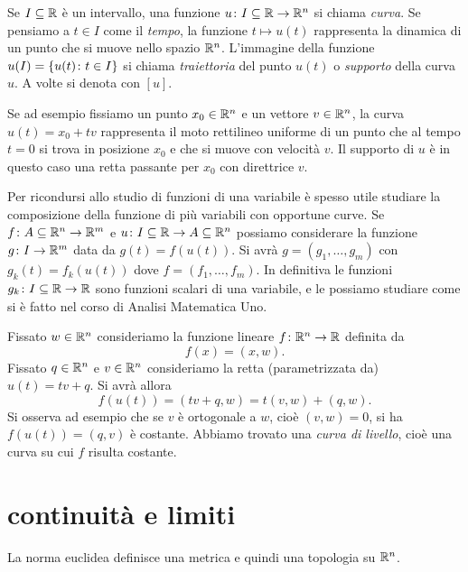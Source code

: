 Se $I\subseteq {\mathbb R}$ è un intervallo, 
una funzione $ u\colon I\subseteq {\mathbb R} \to {\mathbb R}^n$ si chiama 
\emph{curva}. 
Se pensiamo a $t\in I$ come il \emph{tempo}, la funzione 
$t\mapsto  u(t)$ rappresenta la dinamica di un punto 
che si muove nello spazio ${\mathbb R}^n$.
L'immagine della funzione $ u(I) = {\left\{  u(t)\colon t\in I \right\}}$
si chiama \emph{traiettoria} del punto $ u(t)$ o \emph{supporto}
della curva $ u$.
A volte si denota con $[ u]$.

Se ad esempio fissiamo un punto $ x_0\in {\mathbb R}^n$ 
e un vettore $ v\in {\mathbb R}^n$, la curva $ u(t) =  x_0 + t  v$
rappresenta il moto rettilineo uniforme di un punto che al tempo $t=0$ 
si trova in posizione $x_0$ e che si muove con velocità $ v$.
Il supporto di $ u$ è in questo caso una retta passante per $x_0$ 
con direttrice $ v$.

Per ricondursi allo studio di funzioni di una variabile 
è spesso utile studiare la composizione della funzione di più variabili 
con opportune curve. 
Se $ f\colon A \subseteq {\mathbb R}^n\to {\mathbb R}^m$ e $ u\colon I\subseteq {\mathbb R}\to A\subseteq {\mathbb R}^n$ 
possiamo considerare la funzione $ g\colon I \to {\mathbb R}^m$ 
data da $ g(t) =  f( u(t))$. 
Si avrà $ g = (g_1,\dots, g_m)$ con $g_k(t) = f_k( u(t))$
dove $ f = (f_1,\dots, f_m)$. 
In definitiva le funzioni $g_k\colon I\subseteq {\mathbb R} \to {\mathbb R}$ 
sono funzioni scalari di una variabile, e le possiamo studiare 
come si è fatto nel corso di Analisi Matematica Uno.

\begin{example}
Fissato $ w \in {\mathbb R}^n$ consideriamo la funzione 
lineare $f \colon {\mathbb R}^n \to {\mathbb R}$ definita da 
\[
   f( x) = ( x ,  w).
\]  
Fissato $ q\in {\mathbb R}^n$ e $ v \in {\mathbb R}^n$ consideriamo la retta (parametrizzata da)
$ u(t) = t  v +  q$.
Si avrà allora 
\[
  f( u(t)) = (t  v +  q,  w) = t ( v, w) + ( q,  w).
\]
Si osserva ad esempio che se $ v$ è ortogonale a $ w$,
cioè $( v,  w)=0$, si ha $f( u(t))= ( q,  v)$ è costante.
Abbiamo trovato una \emph{curva di livello}, cioè una curva su 
cui $f$ risulta costante.
\end{example}


\section{continuità e limiti}
La norma euclidea definisce una metrica e quindi una topologia 
su ${\mathbb R}^n$. 

